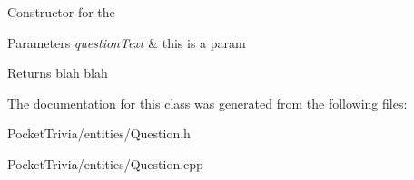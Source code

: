 Constructor for the 
\begin{DoxyParams}{Parameters}
{\em question\+Text} & this is a param \\
\hline
\end{DoxyParams}
\begin{DoxyReturn}{Returns}
blah blah 
\end{DoxyReturn}


The documentation for this class was generated from the following files\+:\begin{DoxyCompactItemize}
\item 
Pocket\+Trivia/entities/Question.\+h\item 
Pocket\+Trivia/entities/Question.\+cpp\end{DoxyCompactItemize}

